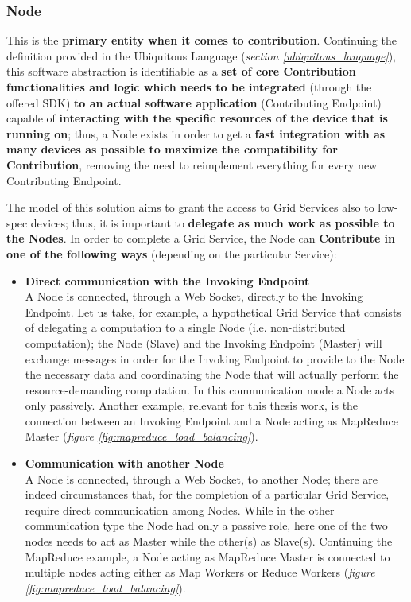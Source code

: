 \subsubsection{Node}
This is the \textbf{primary entity when it comes to contribution}.
Continuing the definition provided in the Ubiquitous Language (\textit{section \ref{ubiquitous_language}}), this software abstraction is identifiable as a \textbf{set of core Contribution functionalities and logic which needs to be integrated} (through the offered SDK) \textbf{to an actual software application} (Contributing Endpoint) capable of \textbf{interacting with the specific resources of the device that is running on}; thus, a Node exists in order to get a \textbf{fast integration with as many devices as possible to maximize the compatibility for Contribution}, removing the need to reimplement everything for every new Contributing Endpoint.

The model of this solution aims to grant the access to Grid Services also to low-spec devices; thus, it is important to \textbf{delegate as much work as possible to the Nodes}. In order to complete a Grid Service, the Node can \textbf{Contribute in one of the following ways} (depending on the particular Service):
\begin{itemize}
\item \textbf{Direct communication with the Invoking Endpoint}\\
A Node is connected, through a Web Socket, directly to the Invoking Endpoint. Let us take, for example, a hypothetical Grid Service that consists of delegating a computation to a single Node (i.e. non-distributed computation); the Node (Slave) and the Invoking Endpoint (Master) will exchange messages in order for the Invoking Endpoint to provide to the Node the necessary data and coordinating the Node that will actually perform the resource-demanding computation. In this communication mode a Node acts only passively.
Another example, relevant for this thesis work, is the connection between an Invoking Endpoint and a Node acting as MapReduce Master (\textit{figure \ref{fig:mapreduce_load_balancing}}).
\item \textbf{Communication with another Node}\\
A Node is connected, through a Web Socket, to another Node; there are indeed circumstances that, for the completion of a particular Grid Service, require direct communication among Nodes. While in the other communication type the Node had only a passive role, here one of the two nodes needs to act as Master while the other(s) as Slave(s). 
Continuing the MapReduce example, a Node acting as MapReduce Master is connected to multiple nodes acting either as Map Workers or Reduce Workers (\textit{figure \ref{fig:mapreduce_load_balancing}}).
\end{itemize}

